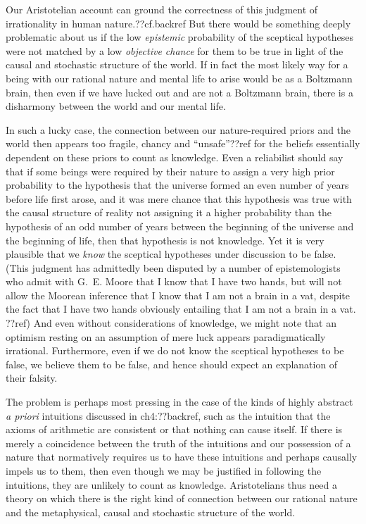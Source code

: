 Our Aristotelian account can ground the correctness of this judgment of irrationality in human nature.??cf.backref 
But there would be something deeply problematic about us if the low \textit{epistemic} probability of the sceptical hypotheses 
were not matched by a low \textit{objective chance} for them to be true in light of the causal and stochastic structure of the world. 
If in fact the most likely way for a being with our rational nature and mental life to arise would be as a Boltzmann
brain, then even if we have lucked out and are not a Boltzmann brain, there is a disharmony between the world and our
mental life. 

In such a lucky case, the connection between our nature-required priors and the world then appears too fragile, chancy and ``unsafe''??ref
for the beliefs essentially dependent on these priors to count as knowledge. Even a reliabilist should say that if some beings
were required by their nature to assign a very high prior probability to the hypothesis that the universe formed an even number 
of years before life first arose, and it was mere chance that this hypothesis was true with the causal structure of reality
not assigning it a higher probability than the hypothesis of an odd number of years between the beginning of the universe and
the beginning of life, then that hypothesis is not knowledge. Yet it is very plausible that we \textit{know} the sceptical hypotheses
under discussion to be false. (This judgment has admittedly been disputed by a number of epistemologists who admit with G.~E. Moore that
I know that I have two hands, but will not allow the Moorean inference that I know that I am not a brain in a vat, despite the fact that I have two hands
obviously entailing that I am not a brain in a vat. ??ref) And even without considerations of knowledge, we might note that an optimism
resting on an assumption of mere luck appears paradigmatically irrational. Furthermore, even if we do not know the
sceptical hypotheses to be false, we believe them to be false, and hence should expect an explanation of their falsity.

The problem is perhaps most pressing in the case of the kinds of highly abstract \textit{a priori} intuitions discussed in ch4:??backref,
such as the intuition that the axioms of arithmetic are consistent or that nothing can cause itself. If there is merely a coincidence
between the truth of the intuitions and our possession of  a nature that normatively requires us to have these intuitions and perhaps causally 
impels us to them, then even though we may be justified in following the intuitions, they are unlikely to count as knowledge.
Aristotelians thus need a theory on which there is the right kind of connection between our rational nature and the metaphysical, causal and 
stochastic structure of the world. 

